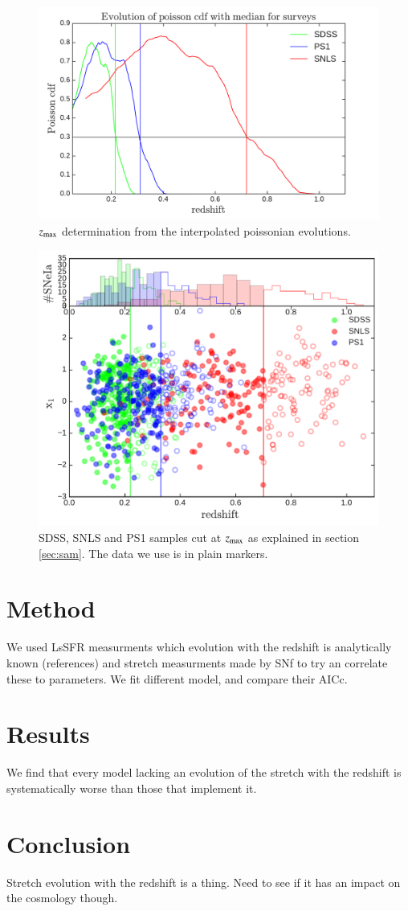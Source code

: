 \documentclass{aa}
\begin{document}
\begin{figure}[htbp!]
    \centering
    \includegraphics[width=\linewidth]{Article_figures/zmax_determination.pdf}
    \caption{$z_{\text{max}}$ determination from the interpolated poissonian
    evolutions.}
    \label{fig:zdet}
\end{figure}

\begin{figure}[htbp!]
    \centering
    \includegraphics[width=\linewidth]{Article_figures/surveys_cuts_x.pdf}
    \caption{SDSS, SNLS and PS1 samples cut at $z_{\text{max}}$ as explained in
    section \ref{sec:sam}. The data we use is in plain markers.}
    \label{fig:surveys_cuts}
\end{figure}


\section{Method}
We used LsSFR measurments which evolution with the redshift is analytically
known (references) and stretch measurments made by SNf to try an correlate these
to parameters. We fit different model, and compare their AICc.

\section{Results}
We find that every model lacking an evolution of the stretch with the redshift
is systematically worse than those that implement it.

\section{Conclusion}
Stretch evolution with the redshift is a thing. Need to see if it has an impact
on the cosmology though.
\end{document}
